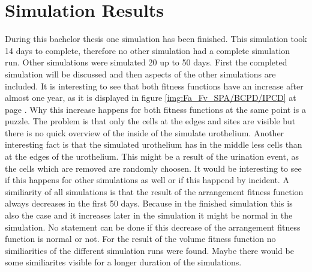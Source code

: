 \section{Simulation Results}\label{sec:SimulationResults}
During this bachelor thesis one simulation has been finished. This simulation took 14 days to complete, therefore no other simulation had a complete simulation run. Other simulations were simulated 20 up to 50 days. First the completed simulation will be discussed and then aspects of the other simulations are included. \newline
It is interesting to see that both fitness functions have an increase after almost one year, as it is displayed in figure \ref{img:Fa_Fv_SPA/BCPD/IPCD} at page \pageref{img:Fa_Fv_SPA/BCPD/IPCD}. Why this increase happens for both fitness functions at the same point is a puzzle. The problem is that only the cells at the edges and sites are visible but there is no quick overview of the inside of the simulate urothelium. Another interesting fact is that the simulated urothelium has in the middle less cells than at the edges of the urothelium. This might be a result of the urination event, as the cells which are removed are randomly choosen. It would be interesting to see if this happens for other simulations as well or if this happend by incident. \newline
A similiarity of all simulations is that the result of the arrangement fitness function always decreases in the first 50 days. Because in the finished simulation this is also the case and it increases later in the simulation it might be normal in the simulation. No statement can be done if this decrease of the arrangement fitness function is normal or not. For the result of the volume fitness function no similiarities of the different simulation runs were found. Maybe there would be some similiarites visible for a longer duration of the simulations.

